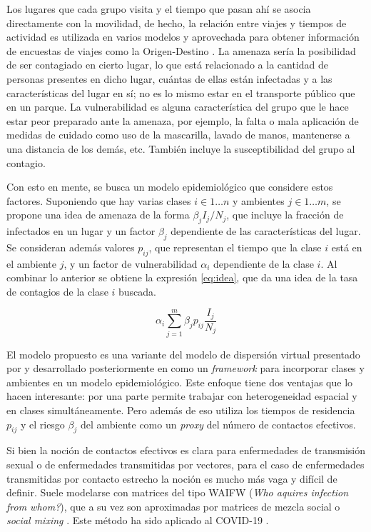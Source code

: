 \begin{intro}
Los lugares que cada grupo visita y el tiempo que pasan ahí se asocia directamente con la movilidad, de hecho, la relación entre viajes y tiempos de actividad es utilizada en varios modelos \cite{Kitamura1988}\cite{Axhausen1992} y aprovechada para obtener información de encuestas de viajes como la Origen-Destino \cite{Munizaga2011}. La amenaza sería la posibilidad de ser contagiado en cierto lugar, lo que está relacionado a la cantidad de personas presentes en dicho lugar, cuántas de ellas están infectadas y a las características del lugar en sí; no es lo mismo estar en el transporte público que en un parque. La vulnerabilidad es alguna característica del grupo que le hace estar peor preparado ante la amenaza, por ejemplo, la falta o mala aplicación de medidas de cuidado como uso de la mascarilla, lavado de manos, mantenerse a una distancia de los demás, etc. También incluye la susceptibilidad del grupo al contagio.

Con esto en mente, se busca un modelo epidemiológico que considere estos factores. Suponiendo que hay varias clases \(i \in 1 \dots n\) y ambientes \(j \in 1 \dots m\), se propone una idea de amenaza de la forma \(\beta_j I_j/N_j\), que incluye la fracción de infectados en un lugar y un factor \(\beta_j\) dependiente de las características del lugar. Se consideran además valores \(p_{ij}\), que representan el tiempo que la clase \(i\) está en el ambiente \(j\), y un factor de vulnerabilidad \(\alpha_i\) dependiente de la clase \(i\). Al combinar lo anterior se obtiene la expresión \ref{eq:idea}, que da una idea de la tasa de contagios de la clase \(i\) buscada.

\begin{equation}\label{eq:idea}
\alpha_i \sum_{j = 1}^m \beta_j p_{ij} \frac{I_j}{N_j}
\end{equation}


El modelo propuesto es una variante del modelo de dispersión virtual presentado por \cite{Bichara2015} y desarrollado posteriormente en \cite{Bichara2018} como un \textit{framework} para incorporar clases y ambientes en un modelo epidemiológico. Este enfoque tiene dos ventajas que lo hacen interesante: por una parte permite trabajar con heterogeneidad espacial y en clases simultáneamente. Pero además de eso utiliza los tiempos de residencia \(p_{ij}\) y el riesgo \(\beta_j\) del ambiente como un \textit{proxy} del número de contactos efectivos.

Si bien la noción de contactos efectivos es clara para enfermedades de transmisión sexual o de enfermedades transmitidas por vectores, para el caso de enfermedades transmitidas por contacto estrecho la noción es mucho más vaga y difícil de definir. Suele modelarse con matrices del tipo WAIFW (\textit{Who aquires infection from whom?}), que a su vez son aproximadas por matrices de mezcla social o \textit{social mixing} \cite{Mossong2008}\cite{Prem2017}. Este método ha sido aplicado al COVID-19 \cite{Prem2020}. 


\end{intro}
